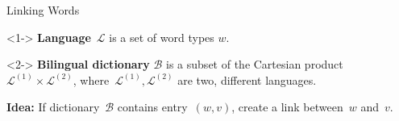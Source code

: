 \begin{frame}{Linking Words}

\begin{definition}<1->
\textbf{Language}~$\mathcal{L}$ is a set of word types $w$.
\end{definition}

\begin{definition}<2->
\textbf{Bilingual dictionary} $\mathcal{B}$ is a subset of the Cartesian product~$\mathcal{L}^{(1)} \times \mathcal{L}^{(2)}$, where~$\mathcal{L}^{(1)}, \mathcal{L}^{(2)}$ are two, different languages.
\end{definition}

\vspace{1cm}
 \textbf{Idea:} If dictionary~$\mathcal{B}$ contains entry~$(w,v)$, create a link between~$w$ and~$v$.
\end{frame}


